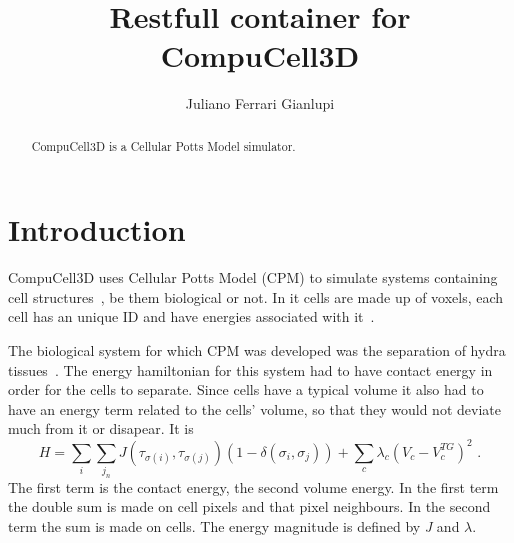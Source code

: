 
\title{Restfull container for CompuCell3D}

\author{Juliano Ferrari Gianlupi}


\renewcommand{\shortauthors}{J. F. Gianlupi}


\begin{abstract}

CompuCell3D is a Cellular Potts Model simulator. 

 
\end{abstract}



\maketitle

\section{Introduction}\label{hid-sp18-601-project-section-introduction}

CompuCell3D uses Cellular Potts Model (CPM) to simulate systems containing 
cell 
structures~\cite{hid-sp18-601-paper-swat2012multi}, be them biological or not.
 In it cells are made up of voxels, each cell has an unique ID and have energies
 associated with it~\cite{hid-sp18-601-paper-glazier1993simulation}.

The biological system for which CPM was developed was the separation of hydra 
tissues~\cite{hid-sp18-601-paper-glazier1993simulation}. The energy hamiltonian 
for this system had to have contact energy in order for the cells to separate. 
Since cells have a typical volume it also had to have an energy term related to 
the cells' volume, so that they would not  deviate much from it or disapear. 
It is
\begin{equation}\label{hid-sp18-601-equation-cpm-orig-hamiltonian}
H = \sum_i \sum_{j_n} J(\tau_{\sigma(i)},\tau_{\sigma(j)
})(1 - \delta(\sigma_i,\sigma_j)) + \sum_{c}\lambda_{c}\left(V_{c
} - V^{TG}_{c}\right)^2\,\,.
\end{equation}
The first term is the contact energy, the second volume energy. In the first 
term the double sum is made on cell pixels and that pixel neighbours. In 
the second term the sum is made on cells. The energy magnitude is defined
by \textit{J} and $\lambda$.

\section{}\label{}



\subsection{}\label{}




 

